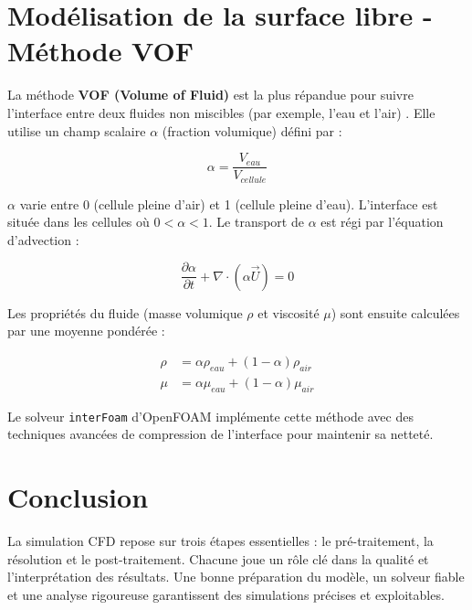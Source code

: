 \section{Modélisation de la surface libre - Méthode VOF}
\label{sec:vof}

La méthode \textbf{VOF (Volume of Fluid)} est la plus répandue pour suivre l'interface entre deux fluides non miscibles (par exemple, l'eau et l'air) \cite{hirt1981volume}. Elle utilise un champ scalaire \(\alpha\) (fraction volumique) défini par :

\begin{equation}
\alpha = \frac{V_{eau}}{V_{cellule}}
\label{eq:vof_alpha}
\end{equation}

\(\alpha\) varie entre 0 (cellule pleine d'air) et 1 (cellule pleine d'eau). L'interface est située dans les cellules où \(0 < \alpha < 1\). Le transport de \(\alpha\) est régi par l'équation d'advection \cite{rider1998reconstructing} :

\begin{equation}
\frac{\partial \alpha}{\partial t} + \nabla \cdot (\alpha \vec{U}) = 0
\label{eq:vof_transport}
\end{equation}

Les propriétés du fluide (masse volumique \(\rho\) et viscosité \(\mu\)) sont ensuite calculées par une moyenne pondérée \cite{scardovelli1999direct} :

\begin{align}
\rho &= \alpha \rho_{eau} + (1-\alpha)\rho_{air} \label{eq:vof_rho} \\
\mu &= \alpha \mu_{eau} + (1-\alpha)\mu_{air} \label{eq:vof_mu}
\end{align}

Le solveur \texttt{interFoam} d'OpenFOAM implémente cette méthode avec des techniques avancées de compression de l'interface pour maintenir sa netteté.

\section{Conclusion}
\label{sec:conclusion_structure_cfd_openfoam}

La simulation CFD repose sur trois étapes essentielles : le pré-traitement, la résolution et le post-traitement. Chacune joue un rôle clé dans la qualité et l'interprétation des résultats. Une bonne préparation du modèle, un solveur fiable et une analyse rigoureuse garantissent des simulations précises et exploitables.

